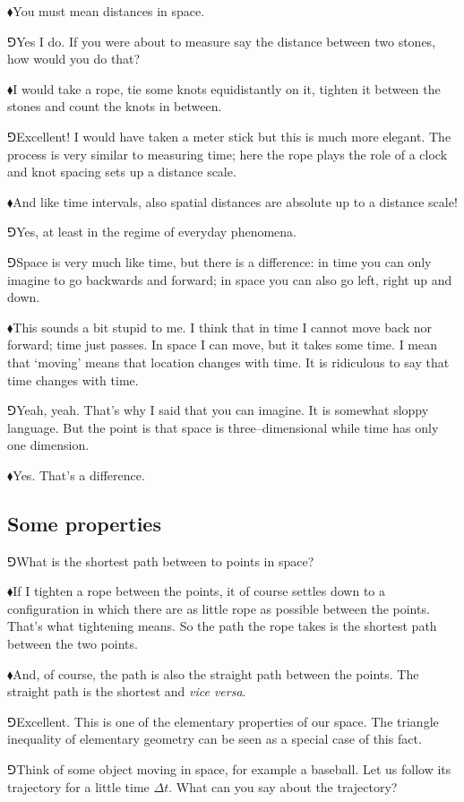 \documentclass[10pt,oneside%
]{memoir}
\newcommand{\hea}{\(\blacklozenge\)\;}
\newcommand{\heb}{\(\Game\)\;}
\begin{document}
\hea You must mean distances in space.

\heb Yes I do. If you were about to measure say the distance between two stones, how would you do that?

\hea I would take a rope, tie some knots equidistantly on it, tighten it between the stones and count the knots in between.

\heb Excellent! I would have taken a meter stick but this is much more elegant. The process is very similar to measuring time; here the rope plays the role of a clock and knot spacing sets up a distance scale.

\hea And like time intervals, also spatial distances are absolute up to a distance scale!

\heb Yes, at least in the regime of everyday phenomena.

\heb Space is very much like time, but there is a difference: in time you can only imagine to go backwards and forward; in space you can also go left, right up and down.

\hea This sounds a bit stupid to me. I think that in time I cannot move back nor forward; time just passes. In space I can move, but it takes some time. I mean that `moving' means that location changes with time. It is ridiculous to say that time changes with time.

\heb Yeah, yeah. That's why I said that you can imagine. It is somewhat sloppy language. But the point is that space is three--dimensional while time has only one dimension.

\hea Yes. That's a difference.
\subsection{Some properties}
\heb What is the shortest path between to points in space?

\hea If I tighten a rope between the points, it of course settles down to a configuration in which there are as little rope as possible between the points. That's what tightening means. So the path the rope takes is the shortest path between the two points.

\hea And, of course, the path is also the straight path between the points. The straight path is the shortest and \emph{vice versa}.

\heb Excellent. This is one of the elementary properties of our space. The triangle inequality of elementary geometry can be seen as a special case of this fact.

\heb Think of some object moving in space, for example a baseball. Let us follow its trajectory for a little time \(\Delta t\). What can you say about the trajectory?
\end{document}
